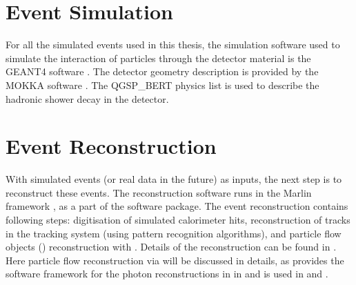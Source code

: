 
\section{Event Simulation}

For all the simulated events used in this thesis, the simulation software used to simulate the interaction of particles through the detector material is the GEANT4 software \cite{Agostinelli:2002hh}. The detector geometry description is provided by the MOKKA software \cite{MoradeFreitas:2002kj}.  The QGSP\_BERT physics list is used to describe the hadronic shower decay in the detector.


\section{Event Reconstruction}

With simulated events (or real data in the future) as inputs, the next step is to reconstruct these events. The reconstruction software runs in the Marlin framework \cite{Gaede:2006pj}, as a part of the \ilcsoft software package. The event reconstruction contains following steps: digitisation of simulated calorimeter hits, reconstruction of tracks in the tracking system (using pattern recognition algorithms), and particle flow objects (\PFOs) reconstruction with \pandora\cite{Thomson:2009rp,Marshall:2012ry}. Details of the reconstruction can be found in \cite{Brau:2007zza,Linssen:2012hp}. Here particle flow reconstruction via \pandora will be discussed in details, as \pandora provides the software framework for the photon reconstructions in \pandora in  and is used in  and .

